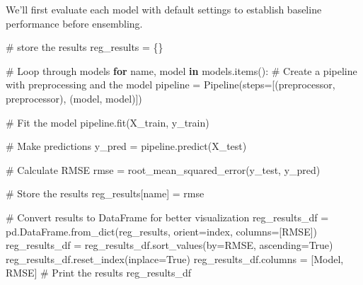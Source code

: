 \documentclass[
  letterpaper,
  DIV=11,
  numbers=noendperiod]{scrreprt}
\newenvironment{Shaded}{\begin{snugshade}}{\end{snugshade}}
\newcommand{\CommentTok}[1]{\textcolor[rgb]{0.37,0.37,0.37}{#1}}
\newcommand{\ControlFlowTok}[1]{\textcolor[rgb]{0.00,0.23,0.31}{\textbf{#1}}}
\newcommand{\KeywordTok}[1]{\textcolor[rgb]{0.00,0.23,0.31}{\textbf{#1}}}
\newcommand{\NormalTok}[1]{\textcolor[rgb]{0.00,0.23,0.31}{#1}}
\newcommand{\OperatorTok}[1]{\textcolor[rgb]{0.37,0.37,0.37}{#1}}
\newcommand{\StringTok}[1]{\textcolor[rgb]{0.13,0.47,0.30}{#1}}
\newcommand{\VariableTok}[1]{\textcolor[rgb]{0.07,0.07,0.07}{#1}}
\begin{document}
We'll first evaluate each model with default settings to establish
baseline performance before ensembling.

\begin{Shaded}
\begin{Highlighting}[]
\CommentTok{\# store the results}
\NormalTok{reg\_results }\OperatorTok{=}\NormalTok{ \{\}}

\CommentTok{\# Loop through models}
\ControlFlowTok{for}\NormalTok{ name, model }\KeywordTok{in}\NormalTok{ models.items():}
    \CommentTok{\# Create a pipeline with preprocessing and the model}
\NormalTok{    pipeline }\OperatorTok{=}\NormalTok{ Pipeline(steps}\OperatorTok{=}\NormalTok{[(}\StringTok{\textquotesingle{}preprocessor\textquotesingle{}}\NormalTok{, preprocessor),}
\NormalTok{                               (}\StringTok{\textquotesingle{}model\textquotesingle{}}\NormalTok{, model)])}
    
    \CommentTok{\# Fit the model}
\NormalTok{    pipeline.fit(X\_train, y\_train)}
    
    \CommentTok{\# Make predictions}
\NormalTok{    y\_pred }\OperatorTok{=}\NormalTok{ pipeline.predict(X\_test)}
    
    \CommentTok{\# Calculate RMSE}
\NormalTok{    rmse }\OperatorTok{=}\NormalTok{ root\_mean\_squared\_error(y\_test, y\_pred)}
    
    \CommentTok{\# Store the results}
\NormalTok{    reg\_results[name] }\OperatorTok{=}\NormalTok{ rmse}

\CommentTok{\# Convert results to DataFrame for better visualization}
\NormalTok{reg\_results\_df }\OperatorTok{=}\NormalTok{ pd.DataFrame.from\_dict(reg\_results, orient}\OperatorTok{=}\StringTok{\textquotesingle{}index\textquotesingle{}}\NormalTok{, columns}\OperatorTok{=}\NormalTok{[}\StringTok{\textquotesingle{}RMSE\textquotesingle{}}\NormalTok{])}
\NormalTok{reg\_results\_df }\OperatorTok{=}\NormalTok{ reg\_results\_df.sort\_values(by}\OperatorTok{=}\StringTok{\textquotesingle{}RMSE\textquotesingle{}}\NormalTok{, ascending}\OperatorTok{=}\VariableTok{True}\NormalTok{)}
\NormalTok{reg\_results\_df.reset\_index(inplace}\OperatorTok{=}\VariableTok{True}\NormalTok{)}
\NormalTok{reg\_results\_df.columns }\OperatorTok{=}\NormalTok{ [}\StringTok{\textquotesingle{}Model\textquotesingle{}}\NormalTok{, }\StringTok{\textquotesingle{}RMSE\textquotesingle{}}\NormalTok{]}
\CommentTok{\# Print the results}
\NormalTok{reg\_results\_df}
\end{Highlighting}
\end{Shaded}
\end{document}
